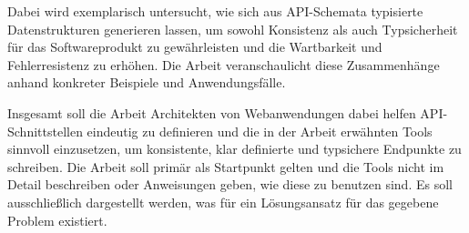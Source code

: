 Dabei wird exemplarisch untersucht, wie sich aus API-Schemata typisierte Datenstrukturen generieren lassen, um sowohl Konsistenz als auch 
Typsicherheit für das Softwareprodukt zu gewährleisten und die Wartbarkeit und Fehlerresistenz zu erhöhen.
Die Arbeit veranschaulicht diese Zusammenhänge anhand konkreter Beispiele und Anwendungsfälle.

Insgesamt soll die Arbeit Architekten von Webanwendungen dabei helfen API-Schnittstellen eindeutig zu definieren und die in der Arbeit erwähnten Tools sinnvoll einzusetzen,
um konsistente, klar definierte und typsichere Endpunkte zu schreiben.
Die Arbeit soll primär als Startpunkt gelten und die Tools nicht im Detail beschreiben oder Anweisungen geben, wie diese zu benutzen sind. Es soll ausschließlich dargestellt
werden, was für ein Lösungsansatz für das gegebene Problem existiert.
